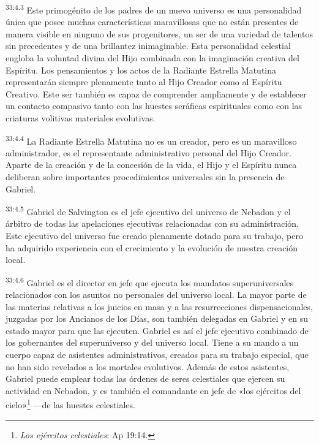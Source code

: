 \par
\textsuperscript{33:4.3} Este primogénito de los padres de un nuevo universo es una personalidad única que posee muchas características maravillosas que no están presentes de manera visible en ninguno de sus progenitores, un ser de una variedad de talentos sin precedentes y de una brillantez inimaginable. Esta personalidad celestial engloba la voluntad divina del Hijo combinada con la imaginación creativa del Espíritu. Los pensamientos y los actos de la Radiante Estrella Matutina representarán siempre plenamente tanto al Hijo Creador como al Espíritu Creativo. Este ser también es capaz de comprender ampliamente y de establecer un contacto compasivo tanto con las huestes seráficas espirituales como con las criaturas volitivas materiales evolutivas.

\par
\textsuperscript{33:4.4} La Radiante Estrella Matutina no es un creador, pero es un maravilloso administrador, es el representante administrativo personal del Hijo Creador. Aparte de la creación y de la concesión de la vida, el Hijo y el Espíritu nunca deliberan sobre importantes procedimientos universales sin la presencia de Gabriel.

\par
\textsuperscript{33:4.5} Gabriel de Salvington es el jefe ejecutivo del universo de Nebadon y el árbitro de todas las apelaciones ejecutivas relacionadas con su administración. Este ejecutivo del universo fue creado plenamente dotado para su trabajo, pero ha adquirido experiencia con el crecimiento y la evolución de nuestra creación local.

\par
\textsuperscript{33:4.6} Gabriel es el director en jefe que ejecuta los mandatos superuniversales relacionados con los asuntos no personales del universo local. La mayor parte de las materias relativas a los juicios en masa y a las resurrecciones dispensacionales, juzgadas por los Ancianos de los Días, son también delegadas en Gabriel y en su estado mayor para que las ejecuten. Gabriel es así el jefe ejecutivo combinado de los gobernantes del superuniverso y del universo local. Tiene a su mando a un cuerpo capaz de asistentes administrativos, creados para su trabajo especial, que no han sido revelados a los mortales evolutivos. Además de estos asistentes, Gabriel puede emplear todas las órdenes de seres celestiales que ejercen su actividad en Nebadon, y es también el comandante en jefe de «los ejércitos del cielo»\footnote{\textit{Los ejércitos celestiales}: Ap 19:14.} ---de las huestes celestiales.

